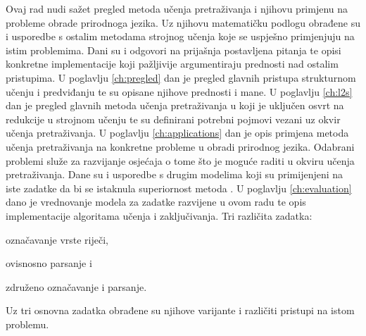 Ovaj rad nudi sažet pregled metoda učenja pretraživanja i njihovu
primjenu na probleme obrade prirodnoga jezika. Uz njihovu matematičku podlogu
obrađene su i usporedbe s ostalim metodama strojnog učenja koje se uspješno
primjenjuju na istim problemima. Dani su i odgovori na prijašnja postavljena
pitanja te opisi konkretne implementacije koji pažljivije argumentiraju
prednosti nad ostalim pristupima.
U poglavlju \ref{ch:pregled} dan je pregled glavnih pristupa strukturnom
učenju i predviđanju te su opisane njihove prednosti i mane.
U poglavlju \ref{ch:l2s} dan je pregled glavnih metoda učenja pretraživanja
u koji je uključen osvrt na redukcije u strojnom učenju te su definirani
potrebni pojmovi vezani uz okvir učenja pretraživanja.
U poglavlju \ref{ch:applications} dan je opis primjena metoda učenja
pretraživanja na konkretne probleme u obradi prirodnog jezika. Odabrani problemi
služe za razvijanje osjećaja o tome što je moguće raditi u okviru učenja
pretraživanja. Dane su i usporedbe s drugim modelima koji su primijenjeni na
iste zadatke da bi se istaknula superiornost metoda \lts{}.
U poglavlju \ref{ch:evaluation} dano je vrednovanje modela za zadatke
razvijene u ovom radu te opis implementacije algoritama učenja i zaključivanja.
Tri različita zadatka:
\begin{inlinelist}
  \item označavanje vrste riječi,
  \item ovisnosno parsanje i
  \item združeno označavanje i parsanje.
\end{inlinelist}
Uz tri osnovna zadatka obrađene su njihove varijante i različiti pristupi na
istom problemu.
